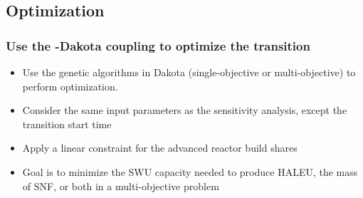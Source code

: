 \subsection{Optimization}
\begin{frame}
    \frametitle{Use the \Cyclus-Dakota coupling to optimize the transition}
    \begin{itemize}
        \item Use the genetic algorithms in Dakota (single-objective or 
        multi-objective) to perform optimization.
        \item Consider the same input parameters as the sensitivity analysis, 
              except the transition start time
        \item<2-> Apply a linear constraint for the advanced reactor build shares
        \item<3-> Goal is to minimize the SWU capacity needed to 
             produce HALEU, the mass of SNF, or both in a multi-objective 
             problem
    \end{itemize}
\end{frame}

